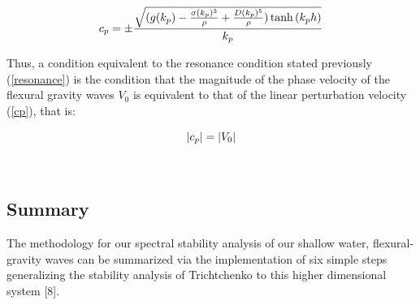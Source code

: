 \documentclass{article}
\begin{document}
\begin{equation} \label{cp}
  c_{p} = \pm \frac{\sqrt{(g(k_{p}) - \frac{\sigma(k_{p})^3}{\rho} + \frac{D(k_{p})^5}{\rho})\tanh{(k_{p}h)}}}{k_{p}}
\\
\end{equation} 

Thus, a condition equivalent to the resonance condition stated previously (\ref{resonance}) is the condition that the magnitude of the phase velocity of the flexural gravity waves \(V_{0}\) is equivalent to that of the linear perturbation velocity (\ref{cp}), that is:

\begin{equation} \label{resonance2}
  |c_{p}| = |V_0| \\
\end{equation} 


\\

\subsection{Summary}

The methodology for our spectral stability analysis of our shallow water, flexural-gravity waves can be summarized via the implementation of six simple steps generalizing the stability analysis of Trichtchenko to this higher dimensional system [8].
\end{document}
